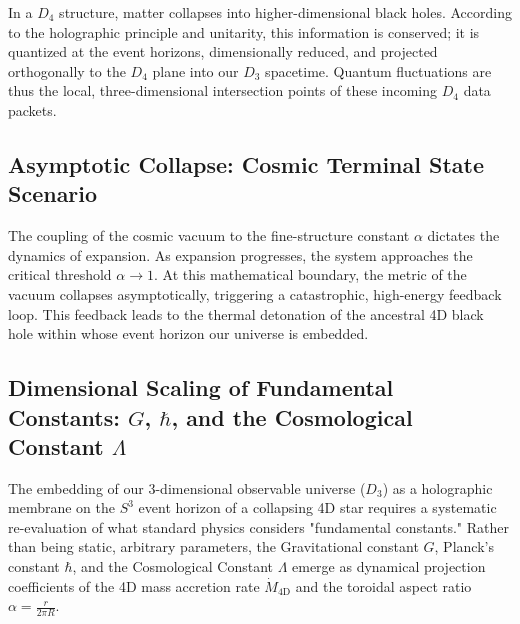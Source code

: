 \documentclass[11pt,a4paper]{article}
\theoremstyle{plain}
\theoremstyle{definition}
\theoremstyle{remark}
\begin{document}
In a $D_4$ structure, matter collapses into higher-dimensional black holes. According to the holographic principle and unitarity, this information is conserved; it is quantized at the event horizons, dimensionally reduced, and projected orthogonally to the $D_4$ plane into our $D_3$ spacetime. Quantum fluctuations are thus the local, three-dimensional intersection points of these incoming $D_4$ data packets.

\subsection{Asymptotic Collapse: Cosmic Terminal State Scenario}
The coupling of the cosmic vacuum to the fine-structure constant $\alpha$ dictates the dynamics of expansion. As expansion progresses, the system approaches the critical threshold $\alpha \to 1$. At this mathematical boundary, the metric of the vacuum collapses asymptotically, triggering a catastrophic, high-energy feedback loop. This feedback leads to the thermal detonation of the ancestral 4D black hole within whose event horizon our universe is embedded.

\subsection{Dimensional Scaling of Fundamental Constants: $G$, $\hbar$, and the Cosmological Constant $\Lambda$}
The embedding of our 3-dimensional observable universe ($D_3$) as a holographic membrane on the $S^3$ event horizon of a collapsing 4D star requires a systematic re-evaluation of what standard physics considers "fundamental constants." Rather than being static, arbitrary parameters, the Gravitational constant $G$, Planck's constant $\hbar$, and the Cosmological Constant $\Lambda$ emerge as dynamical projection coefficients of the 4D mass accretion rate $\dot{M}_{\text{4D}}$ and the toroidal aspect ratio $\alpha = \frac{r}{2\pi R}$.
\end{document}
